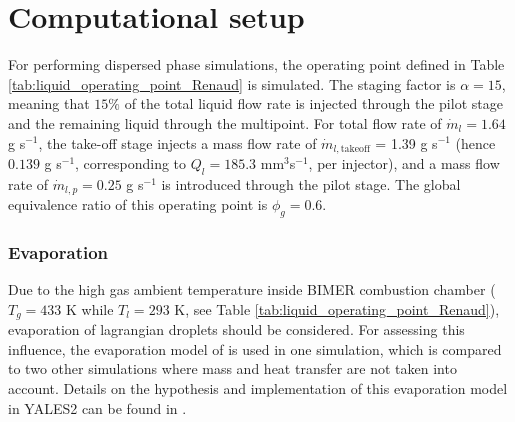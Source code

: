 \section{Computational setup}
\label{ch9:sec_computations_setup}


For performing dispersed phase simulations, the operating point defined in Table \ref{tab:liquid_operating_point_Renaud} is simulated. The staging factor is $\alpha = 15$, meaning that $15 \%$ of the total liquid flow rate is injected through the pilot stage and the remaining liquid through the multipoint. For total flow rate of $\dot{m}_l = 1.64$ g s$^{-1}$, the take-off stage injects a mass flow rate of $\dot{m}_{l,\mathrm{takeoff}}$ = 1.39 g s$^{-1}$ (hence $0.139$ g s$^{-1}$, corresponding to $Q_l = 185.3$ mm$^3$s$^{-1}$,  per injector), and a mass flow rate of $\dot{m}_{l,p} = 0.25$ g s$^{-1}$ is introduced through the pilot stage. The global equivalence ratio of this operating point is $\phi_g = 0.6$.

\subsubsection*{Evaporation}

Due to the high gas ambient temperature inside BIMER combustion chamber ($T_g = 433$ K while $T_l = 293$ K, see Table \ref{tab:liquid_operating_point_Renaud}), evaporation of lagrangian droplets should be considered. For assessing this influence, the evaporation model of  is used in one simulation, which is compared to two other simulations where mass and heat transfer are not taken into account. Details on the hypothesis and implementation of this evaporation model in YALES2 can be found in .




